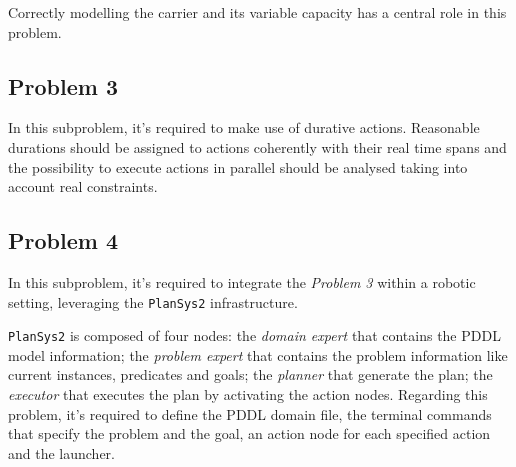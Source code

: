 Correctly modelling the carrier and its variable capacity has a central role in this problem.

\subsection{Problem 3}
In this subproblem, it's required to make use of durative actions.
Reasonable durations should be assigned to actions coherently with their real time spans and the possibility 
to execute actions in parallel should be analysed taking into account real constraints.

\subsection{Problem 4}
In this subproblem, it's required to integrate the \textit{Problem 3} within a robotic setting, leveraging the 
\texttt{PlanSys2} infrastructure.

\texttt{PlanSys2} is composed of four nodes: the \textit{domain expert} that contains the PDDL model 
information; the \textit{problem expert} that contains the problem information like current instances,
predicates and goals; the \textit{planner} that generate the plan; the \textit{executor} that executes
the plan by activating the action nodes.
Regarding this problem, it's required to define the PDDL domain file, the terminal commands that specify
the problem and the goal, an action node for each specified action and the launcher.

